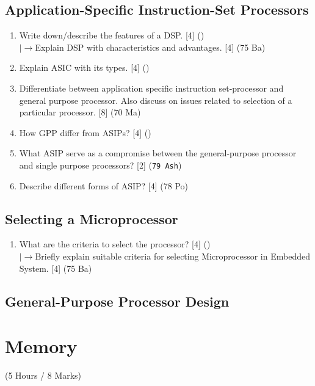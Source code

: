 \documentclass[12pt]{article}
\newcommand{\lb}{\\$\left|\rightarrow\right.$}
\begin{document}
  \subsection{Application-Specific Instruction-Set Processors}
    \begin{enumerate}[topsep=0pt]
      \item Write down/describe the features of a DSP. \hfill [4] ()
      \lb Explain DSP with characteristics and advantages. \hfill [4] (75 Ba)
      
      \item Explain ASIC with its types. \hfill [4] ()
      
      \item Differentiate between application specific instruction set-processor and general purpose processor. Also discuss on issues related to selection of a particular processor. \hfill [8] (70 Ma)
      
      \item How GPP differ from ASIPs? \hfill [4] () 

      \item What ASIP serve as a compromise between the general-purpose processor and single purpose processors? \hfill [2] (\texttt{79 Ash})

      \item Describe different forms of ASIP? \hfill [4] (78 Po)
    \end{enumerate}

  \subsection{Selecting a Microprocessor}
    \begin{enumerate}[topsep=0pt]
      \item What are the criteria to select the processor? \hfill [4] ()
      \lb Briefly explain suitable criteria for selecting Microprocessor in Embedded System. \hfill [4] (75 Ba)
    \end{enumerate}
  
    \subsection{General-Purpose Processor Design}

\pagebreak

\section{Memory}
  \begin{center}(5 Hours / 8 Marks)\end{center}
  
\end{document}
